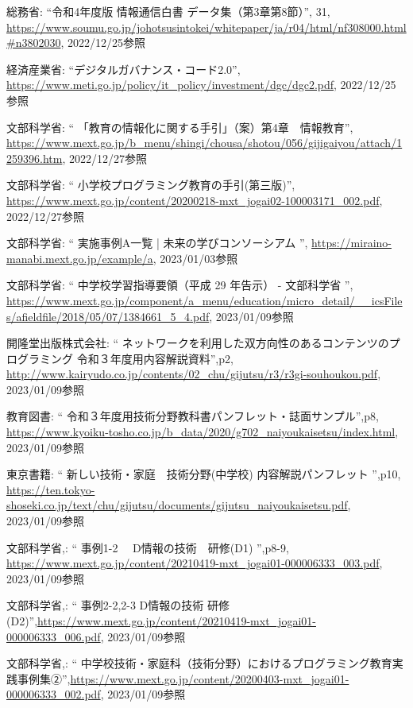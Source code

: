 \documentclass[12pt,a4j,titlepage]{ltjsarticle}
\begin{document}
\begin{thebibliography}{99}
 総務省: ``令和4年度版 情報通信白書 データ集（第3章第8節）'', 31,
\url{https://www.soumu.go.jp/johotsusintokei/whitepaper/ja/r04/html/nf308000.html#n3802030}, 2022/12/25参照

 経済産業省: ``デジタルガバナンス・コード2.0'', \url{https://www.meti.go.jp/policy/it_policy/investment/dgc/dgc2.pdf}, 2022/12/25参照

 文部科学省: `` 「教育の情報化に関する手引」（案）第4章　情報教育'', \url{https://www.mext.go.jp/b_menu/shingi/chousa/shotou/056/gijigaiyou/attach/1259396.htm}, 2022/12/27参照

 文部科学省: `` 小学校プログラミング教育の手引(第三版)'', \url{https://www.mext.go.jp/content/20200218-mxt_jogai02-100003171_002.pdf}, 2022/12/27参照

 文部科学省: `` 実施事例A一覧 | 未来の学びコンソーシアム '', \url{https://miraino-manabi.mext.go.jp/example/a}, 2023/01/03参照

 文部科学省: `` 中学校学習指導要領（平成 29 年告示） - 文部科学省 '', \url{https://www.mext.go.jp/component/a_menu/education/micro_detail/__icsFiles/afieldfile/2018/05/07/1384661_5_4.pdf}, 2023/01/09参照

 開隆堂出版株式会社: `` ネットワークを利用した双方向性のあるコンテンツのプログラミング 令和３年度用内容解説資料'',p2, \url{http://www.kairyudo.co.jp/contents/02_chu/gijutsu/r3/r3gi-souhoukou.pdf}, 2023/01/09参照

 教育図書: `` 令和３年度用技術分野教科書パンフレット・誌面サンプル'',p8, \url{https://www.kyoiku-tosho.co.jp/b_data/2020/g702_naiyoukaisetsu/index.html}, 2023/01/09参照

 東京書籍: `` 新しい技術・家庭　技術分野(中学校) 内容解説パンフレット '',p10, \url{https://ten.tokyo-shoseki.co.jp/text/chu/gijutsu/documents/gijutsu_naiyoukaisetsu.pdf}, 2023/01/09参照

 文部科学省,: `` 事例1-2 　D情報の技術　研修(D1) '',p8-9, \url{https://www.mext.go.jp/content/20210419-mxt_jogai01-000006333_003.pdf}, 2023/01/09参照

 文部科学省,: `` 事例2-2,2-3 D情報の技術 研修(D2)'',\url{https://www.mext.go.jp/content/20210419-mxt_jogai01-000006333_006.pdf}, 2023/01/09参照

 文部科学省,: `` 中学校技術・家庭科（技術分野）におけるプログラミング教育実践事例集②'',\url{https://www.mext.go.jp/content/20200403-mxt_jogai01-000006333_002.pdf}, 2023/01/09参照


\end{thebibliography}
\end{document}
